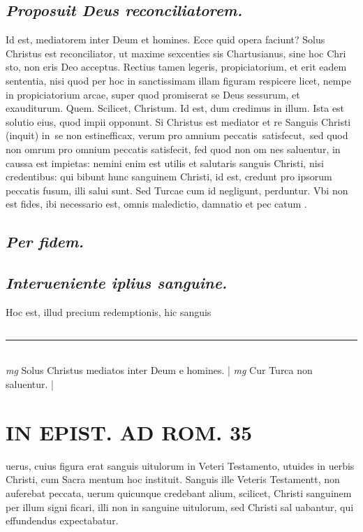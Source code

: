 \documentclass{article}
\begin{document}
\begin{pages}
\subsection*{\textit{Proposuit Deus reconciliatorem. }}\pstart Id est, mediatorem inter Deum et homines. Ecce quid opera faciunt? Solus Christus est reconciliator, ut maxime sexcenties sis Chartusianus, sine hoc Chri sto, non eris Deo acceptus. Rectius tamen legeris, propiciatorium, et erit eadem sententia, nisi quod per hoc in sanctissimam illam figuram respicere licet, nempe in propiciatorium arcae, super quod promiserat se Deus sessurum, et exauditurum.   \pend\pstart Quem. Scilicet, Christum.  \pend\pstart Id est, dum credimus in illum. Ista est solutio eius, quod impii opponunt. Si Christus est mediator et re Sanguis Christi (inquit) in se non estinefficax, verum pro amnium peccatis satisfecut, sed quod non omrum pro omnium peccatis satisfecit, fed quod non om nes saluentur, in caussa est impietas: nemini enim est utilis et salutaris sanguis Christi, nisi credentibus: qui bibunt hunc sanguinem Christi, id est, credunt pro ipsorum peccatis fusum, illi salui sunt. Sed Turcae cum id negligunt, perduntur. Vbi non est fides, ibi necessario est, omnis maledictio, damnatio et pec catum .   \pend
{}
{}
\subsection*{\textit{Per fidem. }}
{}
\subsection*{\textit{Interueniente iplius sanguine. }}\pstart Hoc est, illud precium redemptionis, hic sanguis  \pend
{}
{}
\subsection*{\textit{}}
\vspace{0.5cm}\noindent
\vspace{0.2cm}\rule{1cm}{0.2pt}\\ 
\hspace{0.2cm}\textit{mg}
\footnotesize Solus Christus mediatos inter Deum e homines. 
\normalsize| 
\hspace{0.2cm}\textit{mg}
\footnotesize Cur Turca non saluentur. 
\normalsize| 
\section*{IN EPIST. AD ROM. 35 }
\marginpar{[ p.]}\pstart uerus, cuius figura erat sanguis uitulorum in Veteri Testamento, utuides in uerbis Christi, cum Sacra mentum hoc instituit. Sanguis ille Veteris Testamentt, non auferebat peccata, uerum quicunque credebant alium, scilicet, Christi sanguinem per illum signi ficari, illi non in sanguine uitulorum, sed Christi sal uabantur, qui effundendus expectabatur.  \pend
{}
{}

\end{pages}
\end{document}
